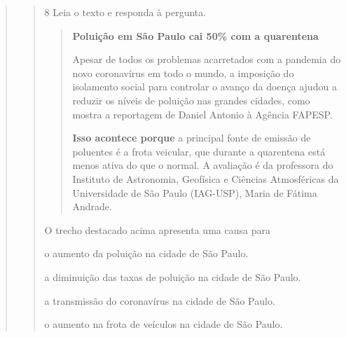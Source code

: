 \begin{escolha}
\begin{escolha}
\begin{escolha}
\begin{quote}
\begin{quote}
\num{8} Leia o texto e responda à pergunta.

\begin{quote}
\textbf{Poluição em São Paulo cai 50\% com a quarentena}

Apesar de todos os problemas acarretados com a pandemia do novo
coronavírus em todo o mundo, a imposição do isolamento social para
controlar o avanço da doença ajudou a reduzir os níveis de poluição nas
grandes cidades, como mostra a reportagem de Daniel Antonio à Agência
FAPESP.

\textbf{Isso acontece porque} a principal fonte de emissão de poluentes é a
frota veicular, que durante a quarentena está menos ativa do que o
normal. A avaliação é da professora do Instituto de Astronomia,
Geofísica e Ciências Atmosféricas da Universidade de São Paulo
(IAG-USP), Maria de Fátima Andrade.
\end{quote}


O trecho destacado acima apresenta uma causa para

\begin{escolha}
  \item o aumento da poluição na cidade de São Paulo.

  \item a diminuição das taxas de poluição na cidade de São Paulo.

  \item a transmissão do coronavírus na cidade de São Paulo.

  \item o aumento na frota de veículos na cidade de São Paulo.
\end{escolha}

\end{quote}
\end{quote}
\end{escolha}
\end{escolha}
\end{escolha}
